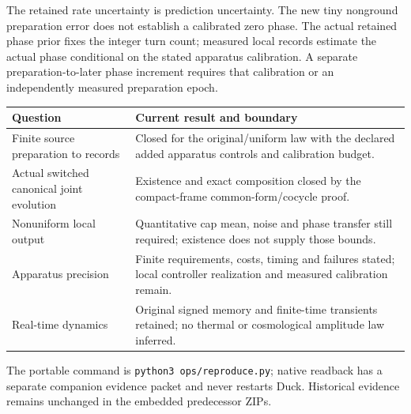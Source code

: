 The retained rate uncertainty is prediction uncertainty. The new tiny
nonground preparation error does not establish a calibrated zero phase.
The actual retained phase prior fixes the integer turn count; measured
local records estimate the actual phase conditional on the stated
apparatus calibration. A separate preparation-to-later phase increment
requires that calibration or an independently measured preparation epoch.

\begin{center}\small
\begin{tabular}{p{}p{}}
\toprule
Question & Current result and boundary\\
\midrule
Finite source preparation to records & Closed for the original/uniform
law with the declared added apparatus controls and calibration budget.\\
Actual switched canonical joint evolution & Existence and exact
composition closed by the compact-frame common-form/cocycle proof.\\
Nonuniform local output & Quantitative cap mean, noise and phase
transfer still required; existence does not supply those bounds.\\
Apparatus precision & Finite requirements, costs, timing and failures
stated; local controller realization and measured calibration remain.\\
Real-time dynamics & Original signed memory and finite-time transients
retained; no thermal or cosmological amplitude law inferred.\\
\bottomrule
\end{tabular}
\end{center}

The portable command is \texttt{python3 ops/reproduce.py}; native readback
has a separate companion evidence packet and never restarts Duck.
Historical evidence remains unchanged in the embedded predecessor ZIPs.
